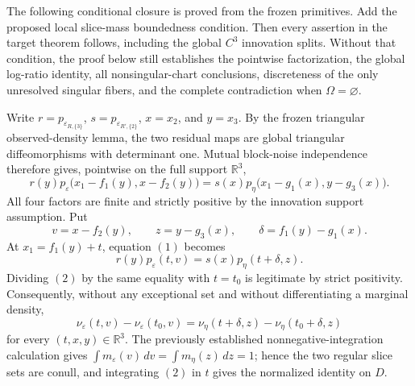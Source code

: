 The following conditional closure is proved from the frozen primitives.  Add the proposed local slice-mass boundedness condition.  Then every assertion in the target theorem follows, including the global \(C^3\) innovation splits.  Without that condition, the proof below still establishes the pointwise factorization, the global log-ratio identity, all nonsingular-chart conclusions, discreteness of the only unresolved singular fibers, and the complete contradiction when \(\Omega=\varnothing\).

Write \(r=p_{\varepsilon_{R,\{3\}}}\), \(s=p_{\varepsilon_{R',\{2\}}}\), \(x=x_2\), and \(y=x_3\).  By the frozen triangular observed-density lemma, the two residual maps are global triangular diffeomorphisms with determinant one.  Mutual block-noise independence therefore gives, pointwise on the full support \(\mathbb R^3\),
\[
 r(y)p_\varepsilon\bigl(x_1-f_1(y),x-f_2(y)\bigr)
 =s(x)p_\eta\bigl(x_1-g_1(x),y-g_3(x)\bigr).
\tag{1}
\]
All four factors are finite and strictly positive by the innovation support assumption.  Put
\[
 v=x-f_2(y),\qquad z=y-g_3(x),\qquad
 \delta=f_1(y)-g_1(x).
\]
At \(x_1=f_1(y)+t\), equation \((1)\) becomes
\[
 r(y)p_\varepsilon(t,v)=s(x)p_\eta(t+\delta,z).
\tag{2}
\]
Dividing \((2)\) by the same equality with \(t=t_0\) is legitimate by strict positivity.  Consequently, without any exceptional set and without differentiating a marginal density,
\[
 \nu_\varepsilon(t,v)-\nu_\varepsilon(t_0,v)
 =\nu_\eta(t+\delta,z)-\nu_\eta(t_0+\delta,z)
\tag{3}
\]
for every \((t,x,y)\in\mathbb R^3\).  The previously established nonnegative-integration calculation gives \(\int m_\varepsilon(v)\,dv=\int m_\eta(z)\,dz=1\); hence the two regular slice sets are conull, and integrating \((2)\) in \(t\) gives the normalized identity on \(D\).

